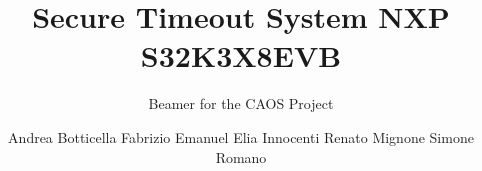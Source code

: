 \documentclass{beamer}
\title{Secure Timeout System \newline NXP S32K3X8EVB}
\subtitle{Beamer for the CAOS Project}
\author{
    \newline Andrea Botticella
    \newline Fabrizio Emanuel 
    \newline Elia Innocenti
    \newline Renato Mignone 
    \newline Simone Romano     
}
\begin{document}
\maketitle


%
%
%
%

\title{}
\backmatter
\end{document}
